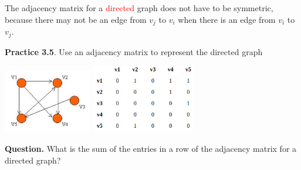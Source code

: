 \documentclass[aspectratio=169]{beamer}
\providecommand{\Red}[1]{\textcolor{red}{#1}}
\begin{document}
\begin{frame}[plain]{}

 The adjacency matrix for a \Red{directed} graph does not have to be symmetric,
 because there may not be an edge from $v_j$ to $v_i$ when there is an edge from 
 $v_i$ to $v_j$.
 \medskip
 
{\bf Practice 3.5}.  Use an adjacency matrix to represent the directed graph
 
 \begin{center}
  \includegraphics[height=2.8cm]{./img/lecture3-fig6a.jpg}\hspace{.4in}\pause
   \includegraphics[height=3cm]{./img/lecture3-fig6b.jpg}
 \end{center}

{\bf Question.}  What is the sum of the entries in a row of the adjacency
matrix for a directed graph?
 \vspace{.5in}
    
\end{frame}
\end{document}
